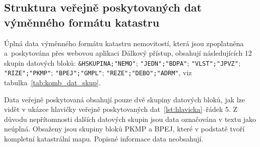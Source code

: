 \subsection{Struktura veřejně poskytovaných dat výměnného formátu katastru}
\label{subsec:neuplna_data}

Úplná data výměnného formátu katastru nemovitostí, která jsou
zpoplatněna a~poskytována přes webovou aplikaci Dálkový přístup,
obsahují následujících 12 skupin datových bloků:
\verb|&HSKUPINA;"NEMO"|; \verb|"JEDN";"BDPA"|; \verb|"VLST";"JPVZ"|;
\verb|"RIZE";"PKMP"|; \verb|"BPEJ";"GMPL"|;
\verb|"REZE";"DEBO";"ADRM"|, viz tabulka~\ref{tab:komb_dat_skup}.

Data veřejně poskytovaná obsahují pouze dvě skupiny datových bloků, jak lze vidět v
ukázce hlavičky veřejně poskytovaných dat~\ref{lst:hlavicka}--řádek 5. Z důvodu
nepřítomnosti dalších datových skupin jsou data označována v textu jako
neúplná. Obsaženy jsou skupiny bloků PKMP a BPEJ, které v podstatě tvoří
kompletní katastrální mapu. Popisné informace data neobsahují.

